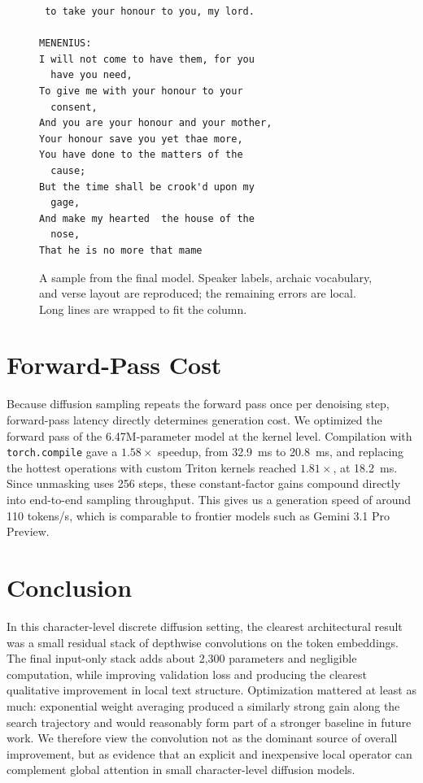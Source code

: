 \documentclass[11pt]{article}
\begin{document}
\begin{figure}[t]
  \centering
  \footnotesize
\begin{verbatim}
 to take your honour to you, my lord.

MENENIUS:
I will not come to have them, for you
  have you need,
To give me with your honour to your
  consent,
And you are your honour and your mother,
Your honour save you yet thae more,
You have done to the matters of the
  cause;
But the time shall be crook'd upon my
  gage,
And make my hearted  the house of the
  nose,
That he is no more that mame
\end{verbatim}
  \caption{A sample from the final model. Speaker labels, archaic vocabulary, and
  verse layout are reproduced; the remaining errors are local. Long lines are
  wrapped to fit the column.}
  \label{fig:sample}
\end{figure}

\section{Forward-Pass Cost}
\label{sec:perf}

Because diffusion sampling repeats the forward pass once per denoising step,
forward-pass latency directly determines generation cost. We optimized the
forward pass of the 6.47M-parameter model at the kernel level. Compilation with
\texttt{torch.compile} gave a $1.58\times$ speedup, from 32.9~ms to 20.8~ms, and
replacing the hottest operations with custom Triton kernels
\citep{tillet2019triton} reached $1.81\times$, at 18.2~ms. Since unmasking uses
256 steps, these constant-factor gains compound directly into end-to-end
sampling throughput. This gives us a generation speed of around 110 tokens/s, 
which is comparable to frontier models such as Gemini 3.1 Pro Preview.

\section{Conclusion}

In this character-level discrete diffusion setting, the clearest architectural result was a small residual stack of depthwise convolutions on the token embeddings. The final input-only stack adds about 2,300 parameters and negligible computation, while improving validation loss and producing the clearest qualitative improvement in local text structure. Optimization mattered at least as much: exponential weight averaging produced a similarly strong gain along the search trajectory and would reasonably form part of a stronger baseline in future work. We therefore view the convolution not as the dominant source of overall improvement, but as evidence that an explicit and inexpensive local operator can complement global attention in small character-level diffusion models.
\end{document}
